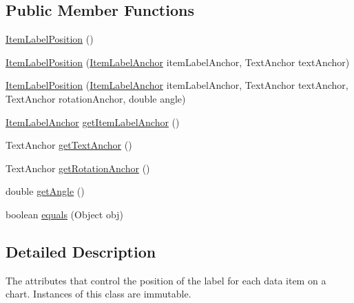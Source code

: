 \subsection*{Public Member Functions}
\begin{DoxyCompactItemize}
\item 
\mbox{\hyperlink{classorg_1_1jfree_1_1chart_1_1labels_1_1_item_label_position_a98aa2f09c5b52bed09901eae708345ff}{Item\+Label\+Position}} ()
\item 
\mbox{\hyperlink{classorg_1_1jfree_1_1chart_1_1labels_1_1_item_label_position_accdcb98cb816ed283c8f770d81f96d37}{Item\+Label\+Position}} (\mbox{\hyperlink{classorg_1_1jfree_1_1chart_1_1labels_1_1_item_label_anchor}{Item\+Label\+Anchor}} item\+Label\+Anchor, Text\+Anchor text\+Anchor)
\item 
\mbox{\hyperlink{classorg_1_1jfree_1_1chart_1_1labels_1_1_item_label_position_a3dfb959f7af6a947a6634396fe6c70be}{Item\+Label\+Position}} (\mbox{\hyperlink{classorg_1_1jfree_1_1chart_1_1labels_1_1_item_label_anchor}{Item\+Label\+Anchor}} item\+Label\+Anchor, Text\+Anchor text\+Anchor, Text\+Anchor rotation\+Anchor, double angle)
\item 
\mbox{\hyperlink{classorg_1_1jfree_1_1chart_1_1labels_1_1_item_label_anchor}{Item\+Label\+Anchor}} \mbox{\hyperlink{classorg_1_1jfree_1_1chart_1_1labels_1_1_item_label_position_ae1e429ef7e3466df1e543af13746aafe}{get\+Item\+Label\+Anchor}} ()
\item 
Text\+Anchor \mbox{\hyperlink{classorg_1_1jfree_1_1chart_1_1labels_1_1_item_label_position_a21bd3824fa0cf9d9d20a9b020f12b170}{get\+Text\+Anchor}} ()
\item 
Text\+Anchor \mbox{\hyperlink{classorg_1_1jfree_1_1chart_1_1labels_1_1_item_label_position_a7daae6855353a878213e00a94e2abce4}{get\+Rotation\+Anchor}} ()
\item 
double \mbox{\hyperlink{classorg_1_1jfree_1_1chart_1_1labels_1_1_item_label_position_a50c18882359072d9502ff5a722b1c723}{get\+Angle}} ()
\item 
boolean \mbox{\hyperlink{classorg_1_1jfree_1_1chart_1_1labels_1_1_item_label_position_a6b68a2f489b866d5424f1cbc95cb1353}{equals}} (Object obj)
\end{DoxyCompactItemize}


\subsection{Detailed Description}
The attributes that control the position of the label for each data item on a chart. Instances of this class are immutable. 

